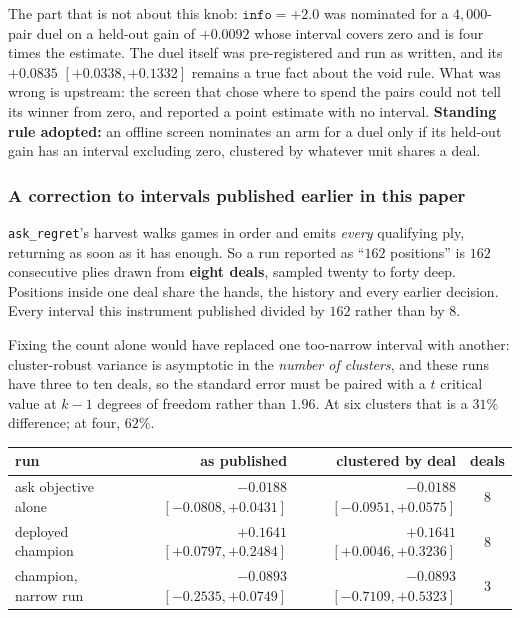 \documentclass[11pt,letterpaper]{article}
\begin{document}
The part that is not about this knob: $\texttt{info} = +2.0$ was nominated for
a $4{,}000$-pair duel on a held-out gain of $+0.0092$ whose interval covers
zero and is four times the estimate. The duel itself was pre-registered and run
as written, and its $+0.0835$ $[+0.0338, +0.1332]$ remains a true fact about
the void rule. What was wrong is upstream: the screen that chose where to spend
the pairs could not tell its winner from zero, and reported a point estimate
with no interval. \textbf{Standing rule adopted:} an offline screen nominates
an arm for a duel only if its held-out gain has an interval excluding zero,
clustered by whatever unit shares a deal.

\subsubsection{A correction to intervals published earlier in this paper}
\label{sec:v11-cluster}

\texttt{ask\_regret}'s harvest walks games in order and emits \emph{every}
qualifying ply, returning as soon as it has enough. So a run reported as
``$162$ positions'' is $162$ consecutive plies drawn from \textbf{eight deals},
sampled twenty to forty deep. Positions inside one deal share the hands, the
history and every earlier decision. Every interval this instrument published
divided by $162$ rather than by $8$.

Fixing the count alone would have replaced one too-narrow interval with
another: cluster-robust variance is asymptotic in the \emph{number of
clusters}, and these runs have three to ten deals, so the standard error must
be paired with a $t$ critical value at $k-1$ degrees of freedom rather than
$1.96$. At six clusters that is a $31\%$ difference; at four, $62\%$.

\begin{center}\small
\begin{tabular}{@{}lrrc@{}}
\toprule
run & as published & clustered by deal & deals \\
\midrule
ask objective alone & $-0.0188$ $[-0.0808, +0.0431]$ & $-0.0188$ $[-0.0951, +0.0575]$ & 8 \\
deployed champion & $+0.1641$ $[+0.0797, +0.2484]$ & $+0.1641$ $[+0.0046, +0.3236]$ & 8 \\
champion, narrow run & $-0.0893$ $[-0.2535, +0.0749]$ & $-0.0893$ $[-0.7109, +0.5323]$ & 3 \\
\bottomrule
\end{tabular}
\end{center}
\end{document}
